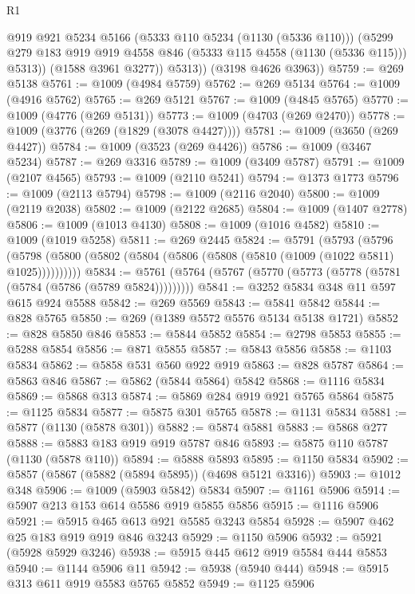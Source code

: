 \begin{lexlean}{R1}
\begin{coremodule}
              @919
              @921
              @5234
              @5166
              (@5333 @110 @5234 (@1130 (@5336 @110)))
              (@5299 @279 @183 @919 @919 @4558 @846 (@5333 @115 @4558 (@1130 (@5336 @115))) @5313))
            (@1588 @3961 @3277))
          @5313))
      (@3198 @4626 @3963))
@5759 := @269 @5138
@5761 := @1009 (@4984 @5759)
@5762 := @269 @5134
@5764 := @1009 (@4916 @5762)
@5765 := @269 @5121
@5767 := @1009 (@4845 @5765)
@5770 := @1009 (@4776 (@269 @5131))
@5773 := @1009 (@4703 (@269 @2470))
@5778 := @1009 (@3776 (@269 (@1829 (@3078 @4427))))
@5781 := @1009 (@3650 (@269 @4427))
@5784 := @1009 (@3523 (@269 @4426))
@5786 := @1009 (@3467 @5234)
@5787 := @269 @3316
@5789 := @1009 (@3409 @5787)
@5791 := @1009 (@2107 @4565)
@5793 := @1009 (@2110 @5241)
@5794 := @1373 @1773
@5796 := @1009 (@2113 @5794)
@5798 := @1009 (@2116 @2040)
@5800 := @1009 (@2119 @2038)
@5802 := @1009 (@2122 @2685)
@5804 := @1009 (@1407 @2778)
@5806 := @1009 (@1013 @4130)
@5808 := @1009 (@1016 @4582)
@5810 := @1009 (@1019 @5258)
@5811 := @269 @2445
@5824 := @5791
    (@5793
      (@5796 (@5798 (@5800 (@5802 (@5804 (@5806 (@5808 (@5810 (@1009 (@1022 @5811) @1025))))))))))
@5834 := @5761 (@5764 (@5767 (@5770 (@5773 (@5778 (@5781 (@5784 (@5786 (@5789 @5824)))))))))
@5841 := @3252 @5834 @348 @11 @597 @615 @924 @5588
@5842 := @269 @5569
@5843 := @5841 @5842
@5844 := @828 @5765
@5850 := @269 (@1389 @5572 @5576 @5134 @5138 @1721)
@5852 := @828 @5850 @846
@5853 := @5844 @5852
@5854 := @2798 @5853
@5855 := @5288 @5854
@5856 := @871 @5855
@5857 := @5843 @5856
@5858 := @1103 @5834
@5862 := @5858 @531 @560 @922 @919
@5863 := @828 @5787
@5864 := @5863 @846
@5867 := @5862 (@5844 @5864) @5842
@5868 := @1116 @5834
@5869 := @5868 @313
@5874 := @5869 @284 @919 @921 @5765 @5864
@5875 := @1125 @5834
@5877 := @5875 @301 @5765
@5878 := @1131 @5834
@5881 := @5877 (@1130 (@5878 @301))
@5882 := @5874 @5881
@5883 := @5868 @277
@5888 := @5883 @183 @919 @919 @5787 @846
@5893 := @5875 @110 @5787 (@1130 (@5878 @110))
@5894 := @5888 @5893
@5895 := @1150 @5834
@5902 := @5857 (@5867 (@5882 (@5894 @5895)) (@4698 @5121 @3316))
@5903 := @1012 @348
@5906 := @1009 (@5903 @5842) @5834
@5907 := @1161 @5906
@5914 := @5907 @213 @153 @614 @5586 @919 @5855 @5856
@5915 := @1116 @5906
@5921 := @5915 @465 @613 @921 @5585 @3243 @5854
@5928 := @5907 @462 @25 @183 @919 @919 @846 @3243
@5929 := @1150 @5906
@5932 := @5921 (@5928 @5929 @3246)
@5938 := @5915 @445 @612 @919 @5584 @444 @5853
@5940 := @1144 @5906 @11
@5942 := @5938 (@5940 @444)
@5948 := @5915 @313 @611 @919 @5583 @5765 @5852
@5949 := @1125 @5906

\end{coremodule}
\end{lexlean}
